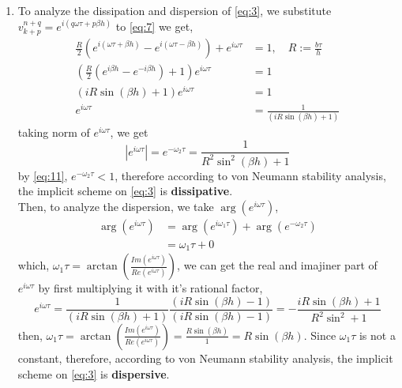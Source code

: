 \documentclass[a4paper,12pt]{article}
\begin{document}
\begin{enumerate}
	\item To analyze the dissipation and dispersion of \eqref{eq:3}, we substitute $v_{k+p}^{n+q} = e^{i(q\omega\tau + p\beta h)}$ to \eqref{eq:7} we get,
	\begin{equation}\label{eq:10}
	\begin{aligned}
	\frac{R}{2} \left(e^{i(\omega\tau + \beta h)} - e^{i(\omega\tau - \beta h)}\right) + e^{i\omega\tau} &= 1, \quad R:=\frac{b\tau}{h}\\
	\left(\frac{R}{2} \left(e^{i\beta h} - e^{-i\beta h}\right) + 1 \right) e^{i\omega \tau} &= 1\\
	\left(iR\sin(\beta h) + 1\right) e^{i\omega \tau} &= 1\\
	e^{i\omega \tau} &= \frac{1}{\left(iR\sin(\beta h) + 1\right)}
	\end{aligned}
	\end{equation}
	taking norm of $e^{i\omega \tau}$, we get
		\begin{equation}\label{eq:11}
		|e^{i\omega \tau}| = e^{-\omega_2\tau} = \frac{1}{R^2\sin^2(\beta h) + 1}
		\end{equation}
	by \eqref{eq:11}, $e^{-\omega_2\tau} < 1$, therefore according to von Neumann stability analysis, the implicit scheme on \eqref{eq:3} is \textbf{dissipative}.\\
	Then, to analyze the dispersion, we take $\arg(e^{i\omega\tau})$,
	\begin{equation}\label{eq:12}
	\begin{aligned}
	\arg(e^{i\omega\tau}) &= \arg(e^{i\omega_1\tau}) + \arg(e^{-\omega_2\tau})\\
	&= \omega_1\tau + 0
	\end{aligned}
	\end{equation}
	which, $\omega_1\tau = \arctan\left(\frac{Im(e^{i\omega \tau})}{Re(e^{i\omega \tau})}\right)$, we can get the real and imajiner part of $e^{i\omega \tau}$ by first multiplying it with it's rational factor,
	\begin{equation}\label{eq:13}
	e^{i\omega \tau} = \frac{1}{\left(iR\sin(\beta h) + 1\right)} \frac{\left(iR\sin(\beta h) - 1\right)}{\left(iR\sin(\beta h) - 1\right)} = -\frac{iR\sin(\beta h)+1}{R^2\sin^2+1}
	\end{equation}
	then, $\omega_1\tau = \arctan\left(\frac{Im(e^{i\omega \tau})}{Re(e^{i\omega \tau})}\right) = \frac{R\sin(\beta h)}{1}=R\sin(\beta h)$. Since $\omega_1\tau$ is not a constant, therefore, according to von Neumann stability analysis, the implicit scheme on \eqref{eq:3} is \textbf{dispersive}.
\end{enumerate}
\end{document}
